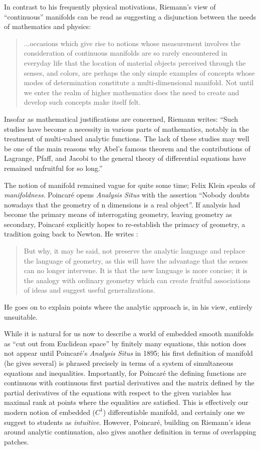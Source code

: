 \documentclass[11pt,leqno]{article}
\renewcommand{\1}{{\rm 1\hspace*{-0.4ex}%
\rule{0.1ex}{1.52ex}\hspace*{0.2ex}}}
\newcommand{\<}[1]{{\langle}#1 {\rangle}}
\theoremstyle{plain}
\theoremstyle{definition}
\theoremstyle{remark}
\numberwithin{equation}{subsection}
\begin{document}
In contrast to his frequently physical motivations, Riemann's view of ``continuous'' manifolds can be read as suggesting a disjunction between the needs of mathematics and physics:
\begin{quote}
	...occasions which give rise to notions whose measurement involves the consideration of continuous manifolds are so  rarely encountered in everyday life that the location of material objects perceived through the senses, and colors, are perhaps the only simple examples of concepts whose modes of determination constitute a multi-dimensional manifold. Not until we enter the realm of higher mathematics does the need to create and develop such concepts make itself felt. 	
\end{quote}
Insofar as mathematical justifications are concerned, Riemann writes: ``Such studies have become a necessity in various parts of mathematics, notably in the treatment of multi-valued analytic functions. The lack of these studies may well be one of the main reasons why Abel's famous theorem and the contributions of Lagrange, Pfaff, and Jacobi to the general theory of differential equations have remained unfruitful for so long.'' 

The notion of manifold remained vague for quite some time; Felix Klein speaks of {\em manifoldness}.  Poincar\'e opens {\em Analysis Situs} with the assertion ``Nobody doubts nowadays that the geometry of n dimensions is a real object''.  If analysis had become the primary means of interrogating geometry, leaving geometry as secondary, Poincar\'e explicitly hopes to re-establish the primacy of geometry, a tradition going back to Newton.  He writes \cite{PoincareTrans}:
\begin{quote}
	But why, it may be said, not preserve the analytic language and replace the language of geometry, as this will have the advantage that the senses can no longer intervene. It is that the new language is more concise; it is the analogy with ordinary geometry which can create fruitful associations of ideas and suggest useful generalizations.
\end{quote}
He goes on to explain points where the analytic approach is, in his view, entirely unsuitable. 

While it is natural for us now to describe a world of embedded smooth manifolds as ``cut out from Euclidean space'' by finitely many equations, this notion does not appear until Poincar\'e's {\em Analysis Situs} in 1895; his first definition of manifold (he gives several) is phrased precisely in terms of a system of simultaneous equations and inequalities.  Importantly, for Poincar\'e the defining functions are continuous with continuous first partial derivatives and the matrix defined by the partial derivatives of the equations with respect to the given variables has maximal rank at points where the equalities are satisfied.  This is effectively our modern notion of embedded ($C^1$) differentiable manifold, and certainly one we suggest to students as {\em intuitive}.  However, Poincar\'e, building on Riemann's ideas around analytic continuation, also gives another definition in terms of overlapping patches.  
\end{document}
